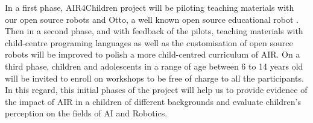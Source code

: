 \documentclass[sigconf]{acmart}
\begin{document}
In a first phase, AIR4Children project will be piloting teaching materials with our open source robots and Otto, a well known open source educational robot \cite{OttoDIY:2016}.  
Then in a second phase, and with feedback of the pilots, teaching materials with child-centre programing languages as well as the customisation of open source robots will be improved to polish a more child-centred curriculum of AIR. 
On a third phase, children and adolescents in a range of age between 6 to 14 years old will be invited to enroll on workshops to be free of charge to all the participants. 
In this regard, this initial phases of the project will help us to provide evidence of the impact of AIR in a children of different backgrounds and evaluate children's perception on the fields of AI and Robotics.  




\end{document}
